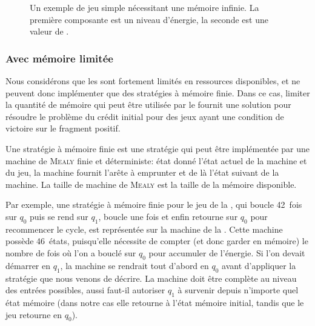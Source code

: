 \begin{figure}[ht]
\centering
{}
\caption[Un exemple de jeu simple nécessitant une mémoire infinie]{Un exemple de jeu simple nécessitant une mémoire infinie. La première composante est un niveau d'énergie, la seconde est une valeur de .}%
\label{tj:fig:infmemoryneeded}
\end{figure}

\subsubsection{Avec mémoire limitée}

Nous considérons que les \rcsfs sont fortement limités en ressources disponibles, et ne peuvent donc implémenter que des stratégies à mémoire finie.
Dans ce cas, limiter \apriori la quantité de mémoire qui peut être utilisée par le  fournit une solution pour résoudre le problème du crédit initial pour des jeux ayant une condition de victoire sur le fragment positif.

Une stratégie à mémoire finie est une stratégie qui peut être implémentée par une machine de \textsc{Mealy} finie et déterministe: état donné l'état actuel de la machine et du jeu, la machine fournit l'arête à emprunter et de là l'état suivant de la machine.
La taille de machine de \textsc{Mealy} est la taille de la mémoire disponible.

Par exemple, une stratégie à mémoire finie pour le jeu de la , qui boucle 42~fois sur $q_0$ puis se rend sur $q_1$, boucle une fois et enfin retourne sur $q_0$ pour recommencer le cycle, est représentée sur la machine de la .
Cette machine possède 46~états, puisqu'elle nécessite de compter (et donc garder en mémoire) le nombre de fois où l'on a bouclé sur $q_0$ pour accumuler de l'énergie.
Si l'on devait démarrer en $q_1$, la machine se rendrait tout d'abord en $q_0$ avant d'appliquer la stratégie que nous venons de décrire.
La machine doit être complète au niveau des entrées possibles, aussi faut-il autoriser $q_1$ à survenir depuis n'importe quel état mémoire (dans notre cas elle retourne à l'état mémoire initial, tandis que le jeu retourne en $q_0$).

